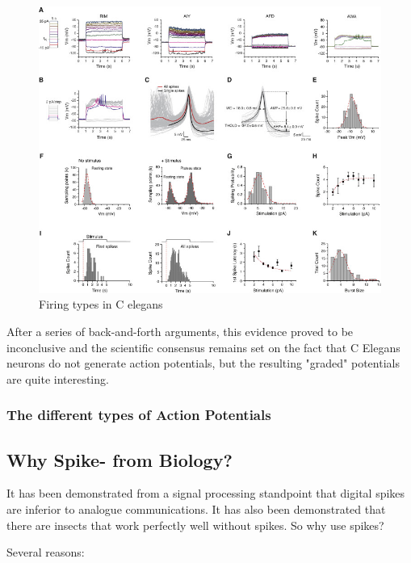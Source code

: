 \documentclass[main]{subfiles}
\begin{document}
\begin{figure}[H]
	\centering
	\includegraphics[width=0.9\linewidth]{09_WhySpikes/figures/celegans-different-neurons.jpg}
	\caption{Firing types in C elegans}
\end{figure}

After a series of back-and-forth arguments, this evidence proved to be inconclusive and the scientific consensus remains set on the fact that C Elegans neurons do not generate action potentials, but the resulting "graded" potentials are quite interesting.

\subsubsection{The different types of Action Potentials}

\subsection{Why Spike- from Biology?}
It has been demonstrated from a signal processing standpoint that digital spikes are inferior to analogue communications. It has also been demonstrated that there are insects that work perfectly well without spikes. So why use spikes?

Several reasons:
\end{document}
